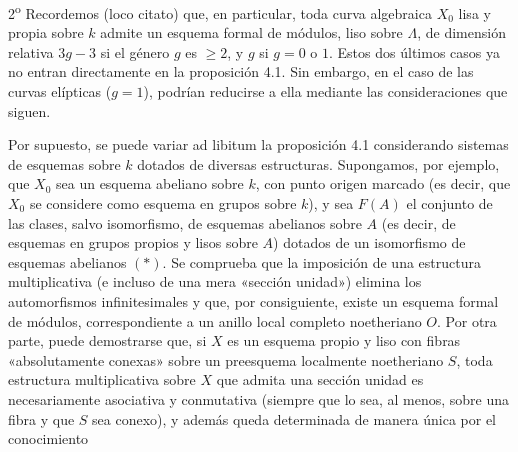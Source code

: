 2\textsuperscript{o} Recordemos (loco citato) que, en particular, toda curva
algebraica $X_0$ lisa y propia sobre $k$ admite un esquema formal de módulos,
liso sobre $\Lambda$, de dimensión relativa $3g-3$ si el género $g$ es
$\geq2$, y $g$ si $g=0$ o $1$. Estos dos últimos casos ya no entran directamente
en la proposición 4.1. Sin embargo, en el caso de las curvas elípticas
($g=1$), podrían reducirse a ella mediante las consideraciones que siguen.

Por supuesto, se puede variar ad libitum la proposición 4.1 considerando
sistemas de esquemas sobre $k$ dotados de diversas estructuras. Supongamos,
por ejemplo, que $X_0$ sea un esquema abeliano sobre $k$, con punto origen
marcado (es decir, que $X_0$ se considere como esquema en grupos sobre $k$), y
sea $F(A)$ el conjunto de las clases, salvo isomorfismo, de esquemas abelianos
sobre $A$ (es decir, de esquemas en grupos propios y lisos sobre $A$) dotados
de un isomorfismo de esquemas abelianos $(*)$. Se comprueba que la imposición
de una estructura multiplicativa (e incluso de una mera «sección unidad»)
elimina los automorfismos infinitesimales y que, por consiguiente, existe un
esquema formal de módulos, correspondiente a un anillo local completo
noetheriano $O$. Por otra parte, puede demostrarse que, si $X$ es un esquema
propio y liso con fibras «absolutamente conexas» sobre un preesquema localmente
noetheriano $S$, toda estructura multiplicativa sobre $X$ que admita una
sección unidad es necesariamente asociativa y conmutativa (siempre que lo sea,
al menos, sobre una fibra y que $S$ sea conexo), y además queda determinada de
manera única por el conocimiento

